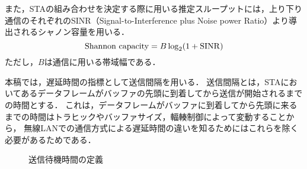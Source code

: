 \documentclass[technicalreport]{ieicej}
\begin{document}
	また，STAの組み合わせを決定する際に用いる推定スループットには，上り下り通信のそれぞれのSINR（Signal-to-Interference plus Noise power Ratio）より導出されるシャノン容量を用いる．
	\begin{equation}
		{\rm Shannon\ capacity}=B\log_2(1+{\rm SINR}) \label{eq:capacity}
	\end{equation}
	ただし，$B$は通信に用いる帯域幅である．
	\par
	本稿では，遅延時間の指標として送信間隔を用いる．
	送信間隔とは，STAにおいてあるデータフレームがバッファの先頭に到着してから送信が開始されるまでの時間とする．
	これは，データフレームがバッファに到着してから先頭に来るまでの時間はトラヒックやバッファサイズ，輻輳制御によって変動することから，
	無線LANでの通信方式による遅延時間の違いを知るためにはこれらを除く必要があるためである．
	\begin{figure}[t]
		\centering
		\caption{送信待機時間の定義}
		\label{fig:standby}
	\end{figure}
\end{document}
